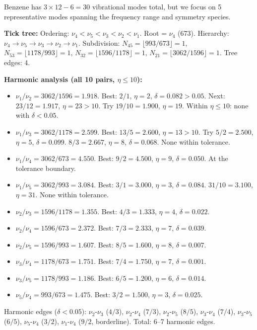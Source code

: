 \documentclass[11pt,twocolumn,a4paper]{article}
\theoremstyle{definition}
\theoremstyle{remark}
\begin{document}
Benzene has $3 \times 12 - 6 = 30$ vibrational modes total, but we focus on 5 representative modes spanning the frequency range and symmetry species.

\textbf{Tick tree:} Ordering: $\nu_4 < \nu_5 < \nu_3 < \nu_2 < \nu_1$. Root = $\nu_4$ (673). Hierarchy: $\nu_4 \to \nu_5 \to \nu_3 \to \nu_2 \to \nu_1$. Subdivision: $N_{45} = \lfloor 993/673 \rfloor = 1$, $N_{53} = \lfloor 1178/993 \rfloor = 1$, $N_{32} = \lfloor 1596/1178 \rfloor = 1$, $N_{21} = \lfloor 3062/1596 \rfloor = 1$. Tree edges: 4.

\textbf{Harmonic analysis (all 10 pairs, $\eta \leq 10$):}

\begin{itemize}[nosep]
\item $\nu_1/\nu_2 = 3062/1596 = 1.918$. Best: $2/1$, $\eta = 2$, $\delta = 0.082 > 0.05$. Next: $23/12 = 1.917$, $\eta = 23 > 10$. Try $19/10 = 1.900$, $\eta = 19$. Within $\eta \leq 10$: none with $\delta < 0.05$.
\item $\nu_1/\nu_3 = 3062/1178 = 2.599$. Best: $13/5 = 2.600$, $\eta = 13 > 10$. Try $5/2 = 2.500$, $\eta = 5$, $\delta = 0.099$. $8/3 = 2.667$, $\eta = 8$, $\delta = 0.068$. None within tolerance.
\item $\nu_1/\nu_4 = 3062/673 = 4.550$. Best: $9/2 = 4.500$, $\eta = 9$, $\delta = 0.050$. At the tolerance boundary.
\item $\nu_1/\nu_5 = 3062/993 = 3.084$. Best: $3/1 = 3.000$, $\eta = 3$, $\delta = 0.084$. $31/10 = 3.100$, $\eta = 31$. None within tolerance.
\item $\nu_2/\nu_3 = 1596/1178 = 1.355$. Best: $4/3 = 1.333$, $\eta = 4$, $\delta = 0.022$.
\item $\nu_2/\nu_4 = 1596/673 = 2.372$. Best: $7/3 = 2.333$, $\eta = 7$, $\delta = 0.039$.
\item $\nu_2/\nu_5 = 1596/993 = 1.607$. Best: $8/5 = 1.600$, $\eta = 8$, $\delta = 0.007$.
\item $\nu_3/\nu_4 = 1178/673 = 1.751$. Best: $7/4 = 1.750$, $\eta = 7$, $\delta = 0.001$.
\item $\nu_3/\nu_5 = 1178/993 = 1.186$. Best: $6/5 = 1.200$, $\eta = 6$, $\delta = 0.014$.
\item $\nu_5/\nu_4 = 993/673 = 1.475$. Best: $3/2 = 1.500$, $\eta = 3$, $\delta = 0.025$.
\end{itemize}

Harmonic edges ($\delta < 0.05$): $\nu_2$-$\nu_3$ ($4/3$), $\nu_2$-$\nu_4$ ($7/3$), $\nu_2$-$\nu_5$ ($8/5$), $\nu_3$-$\nu_4$ ($7/4$), $\nu_3$-$\nu_5$ ($6/5$), $\nu_5$-$\nu_4$ ($3/2$), $\nu_1$-$\nu_4$ ($9/2$, borderline). Total: 6--7 harmonic edges.
\end{document}
